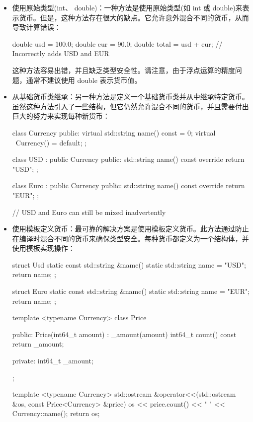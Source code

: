 \begin{itemize}
\item
使用原始类型(int、 double)：一种方法是使用原始类型(如 int 或 double)来表示货币。但是，这种方法存在很大的缺点。它允许意外混合不同的货币，从而导致计算错误：

\begin{cpp}
double usd = 100.0;
double eur = 90.0;
double total = usd + eur; // Incorrectly adds USD and EUR
\end{cpp}

这种方法容易出错，并且缺乏类型安全性。请注意，由于浮点运算的精度问题，通常不建议使用 double 表示货币值。

\item
从基础货币类继承：另一种方法是定义一个基础货币类并从中继承特定货币。虽然这种方法引入了一些结构，但它仍然允许混合不同的货币，并且需要付出巨大的努力来实现每种新货币：

\begin{cpp}
class Currency {
public:
    virtual std::string name() const = 0;
    virtual ~Currency() = default;
};

class USD : public Currency {
public:
    std::string name() const override { return "USD"; }
};

class Euro : public Currency {
public:
    std::string name() const override { return "EUR"; }
};

// USD and Euro can still be mixed inadvertently
\end{cpp}

\item
使用模板定义货币：最可靠的解决方案是使用模板定义货币。此方法通过防止在编译时混合不同的货币来确保类型安全。每种货币都定义为一个结构体，并使用模板实现操作：

\begin{cpp}
struct Usd {
    static const std::string &name() {
        static std::string name = "USD";
        return name;
    }
};

struct Euro {
    static const std::string &name() {
        static std::string name = "EUR";
        return name;
    }
};

template <typename Currency>
class Price {
public:
    Price(int64_t amount) : _amount(amount) {}
    int64_t count() const { return _amount; }

private:
    int64_t _amount;
};

template <typename Currency>
std::ostream &operator<<(std::ostream &os, const Price<Currency> &price) {
    os << price.count() << " " << Currency::name();
    return os;
}


\end{cpp}
\end{itemize}
